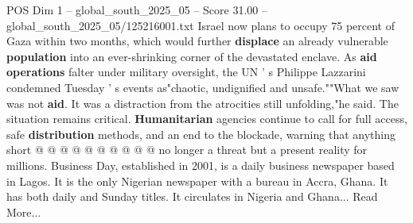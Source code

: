 \begin{textsample}{POS Dim 1 – global\_south\_2025\_05 – Score 31.00 – global\_south\_2025\_05/125216001.txt}
Israel now plans to occupy 75 percent of Gaza within two months, which would further \textbf{displace} an already vulnerable \textbf{population} into an ever-shrinking corner of the devastated enclave.
As \textbf{aid} \textbf{operations} falter under military oversight, the UN ' s Philippe Lazzarini condemned Tuesday ' s events as"chaotic, undignified and unsafe.""What we saw was not \textbf{aid}.
It was a distraction from the atrocities still unfolding,"he said.
The situation remains critical. \textbf{Humanitarian} agencies continue to call for full access, safe \textbf{distribution} methods, and an end to the blockade, warning that anything short @ @ @ @ @ @ @ @ @ @ no longer a threat but a present reality for millions.
Business Day, established in 2001, is a daily business newspaper based in Lagos.
It is the only Nigerian newspaper with a bureau in Accra, Ghana.
It has both daily and Sunday titles.
It circulates in Nigeria and Ghana...
Read More...

\end{textsample}
